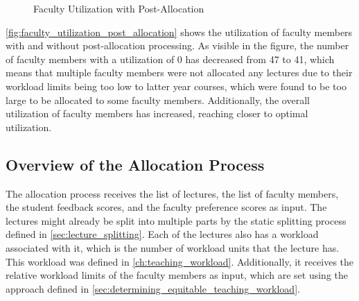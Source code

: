 \begin{figure}[H]
  \centering
  \caption{Faculty Utilization with Post-Allocation}
  \label{fig:faculty_utilization_post_allocation}
\end{figure}

\autoref{fig:faculty_utilization_post_allocation} shows the utilization of faculty members with and without post-allocation processing. As visible in the figure, the number of faculty members with a utilization of 0 has decreased from 47 to 41, which means that multiple faculty members were not allocated any lectures due to their workload limits being too low to latter year courses, which were found to be too large to be allocated to some faculty members. Additionally, the overall utilization of faculty members has increased, reaching closer to optimal utilization.

\subsection{Overview of the Allocation Process}
\label{sec:allocation_process}

The allocation process receives the list of lectures, the list of faculty members, the student feedback scores, and the faculty preference scores as input. The lectures might already be split into multiple parts by the static splitting process defined in \autoref{sec:lecture_splitting}. Each of the lectures also has a workload associated with it, which is the number of workload units that the lecture has. This workload was defined in \autoref{ch:teaching_workload}. Additionally, it receives the relative workload limits of the faculty members as input, which are set using the approach defined in \autoref{sec:determining_equitable_teaching_workload}.


